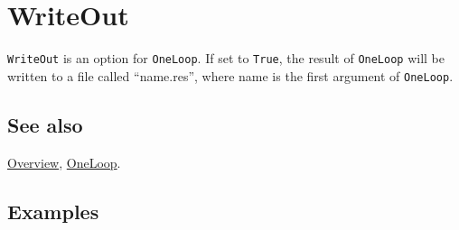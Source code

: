 \documentclass[../FeynCalcManual.tex]{subfiles}
\begin{document}
\hypertarget{writeout}{
\section{WriteOut}\label{writeout}}

\texttt{WriteOut} is an option for \texttt{OneLoop}. If set to
\texttt{True}, the result of \texttt{OneLoop} will be written to a file
called ``name.res'', where name is the first argument of
\texttt{OneLoop}.

\subsection{See also}

\hyperlink{toc}{Overview}, \hyperlink{oneloop}{OneLoop}.

\subsection{Examples}
\end{document}
